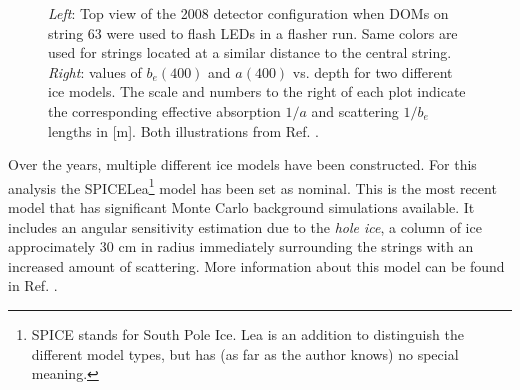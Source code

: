 \begin{figure}[t]
\begin{minipage}{6in}
  \centering
  \hspace*{.7in}
\end{minipage}
\caption{\textit{Left}: Top view of the 2008 detector configuration when DOMs on string 63 were used to flash LEDs in a flasher run. Same colors are used for strings located at a similar distance to the central string. \textit{Right}: values of $b_{e}(400)$ and $a(400)$ vs. depth for two different ice models. The scale and numbers to the right of each plot indicate the corresponding effective  absorption $1/a$ and scattering $1/b_e$ lengths in [m]. Both illustrations from Ref. \cite{1412998}.}
%
\label{fig:2008config}
\end{figure}

Over the years, multiple different ice models have been constructed. For this analysis the SPICELea\footnote{SPICE stands for South Pole Ice. Lea is an addition to distinguish the different model types, but has (as far as the author knows) no special meaning.} model has been set as nominal. This is the most recent model that has significant Monte Carlo background simulations available. It includes an angular sensitivity estimation due to the \textit{hole ice}, a column of ice approcimately 30 cm in radius immediately surrounding the strings with an increased amount of scattering. More information about this model can be found in Ref. \cite{1412998}.
